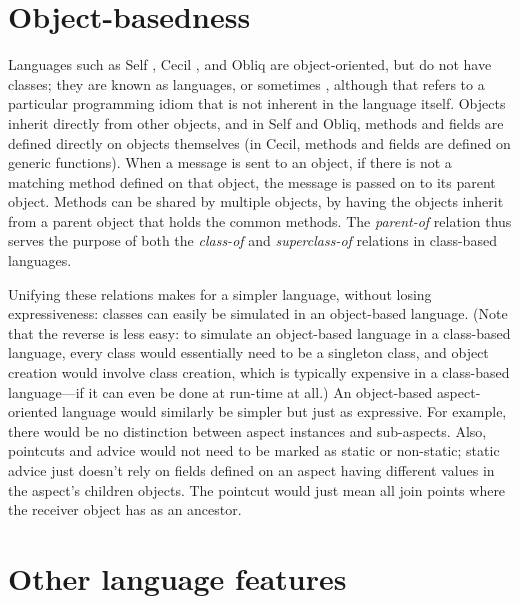 \documentclass[12pt]{article}
\begin{document}
\section{Object-basedness}


Languages such as Self \cite{Self}, Cecil \cite{Cecil}, and Obliq
\cite{Obliq} are object-oriented, but do not have classes; they are
known as  languages, or sometimes
, although that refers to a particular
programming idiom that is not inherent in the language itself.
Objects inherit directly from other objects, and in Self and Obliq,
methods and fields are defined directly on objects themselves (in
Cecil, methods and fields are defined on generic functions).  When a
message is sent to an object, if there is not a matching method
defined on that object, the message is passed on to its parent
object.  Methods can be shared by multiple objects, by having the 
objects inherit from a parent object that holds the common methods.
The \emph{parent-of} relation thus serves the purpose of both
the \emph{class-of} and \emph{superclass-of} relations in class-based
languages.

Unifying these relations makes for a simpler language, without losing
expressiveness: classes can easily be simulated in an object-based
language.  (Note that the reverse is less easy: to simulate an
object-based language in a class-based language, every class would
essentially need to be a singleton class, and object creation would
involve class creation, which is typically expensive in a class-based
language---if it can even be done at run-time at all.)  An
object-based aspect-oriented language would similarly be simpler but
just as expressive.  For example, there would be no distinction
between aspect instances and sub-aspects.  Also, pointcuts and advice
would not need to be marked as static or non-static; static advice
just doesn't rely on fields defined on an aspect having different
values in the aspect's children objects.  The 
pointcut would just mean all join points where the receiver object has
 as an ancestor.

\section{Other language features}\label{other-features}

\end{document}
